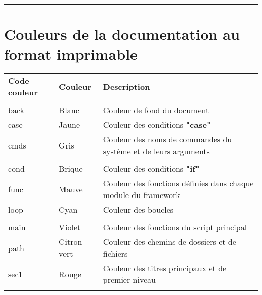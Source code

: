 \documentclass[a4paper,10pt]{article}
\begin{document}
\newpage





\color{sec1}\par\noindent\rule{\textwidth}{0.4pt}\color{text}

\color{red}
\section{Couleurs de la documentation au format imprimable}\color{text}

\begin{justify}
    \begin{tabular}{lll}
        \textbf{Code couleur} & \textbf{Couleur}    & \textbf{Description}\\\\

        \color{text}back  & \color{text}Blanc       & \color{text}Couleur de fond du document\\
        \color{case}case  & \color{case}Jaune       & \color{case}Couleur des conditions \textbf{"case"}\\
        \color{cmds}cmds  & \color{cmds}Gris        & \color{cmds}Couleur des noms de commandes du système et de leurs arguments\\\\

        \color{cond}cond  & \color{cond}Brique      & \color{cond}Couleur des conditions \textbf{"if"}\\
        \color{func}func  & \color{func}Mauve       & \color{func}Couleur des fonctions définies dans chaque module du framework\\
        \color{loop}loop  & \color{loop}Cyan        & \color{loop}Couleur des boucles\\\\

        \color{main}main  & \color{main}Violet      & \color{main}Couleur des fonctions du script principal\\
        \color{path}path  & \color{path}Citron vert & \color{path}Couleur des chemins de dossiers et de fichiers\\
        \color{sec1}sec1  & \color{sec1}Rouge       & \color{sec1}Couleur des titres principaux et de premier niveau\\\\


\end{tabular}
\end{justify}
\end{document}
